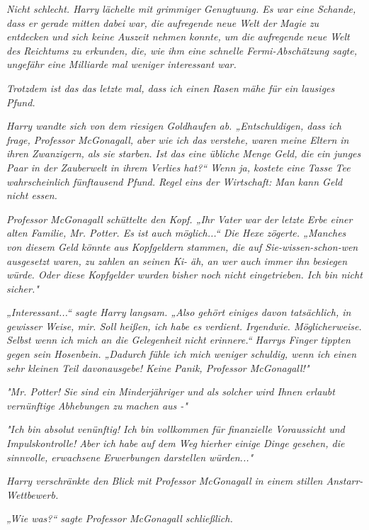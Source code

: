 {\emph{Nicht schlecht. Harry lächelte mit grimmiger Genugtuung. Es war eine Schande, dass er gerade mitten dabei war, die aufregende neue Welt der} \emph{Magie zu entdecken und sich keine Auszeit nehmen konnte, um die aufregende neue Welt des Reichtums zu erkunden, die, wie ihm eine schnelle Fermi-Abschätzung sagte, ungefähr eine Milliarde mal weniger interessant war.}

\emph{\emph{Trotzdem ist das das letzte mal, dass ich einen Rasen mähe für ein lausiges Pfund.}}

\emph{Harry wandte sich von dem riesigen Goldhaufen ab. „Entschuldigen, dass ich frage, Professor McGonagall, aber wie ich das verstehe, waren meine Eltern in ihren Zwanzigern, als sie starben. Ist das eine übliche Menge Geld, die ein junges Paar in der Zauberwelt in ihrem Verlies hat?“ Wenn ja, kostete eine Tasse Tee wahrscheinlich fünftausend Pfund. Regel eins der Wirtschaft: Man kann Geld nicht essen.}

\emph{Professor McGonagall schüttelte den Kopf. „Ihr Vater war der letzte Erbe einer alten Familie, Mr. Potter. Es ist auch möglich...“ Die Hexe zögerte. „Manches von diesem Geld könnte aus Kopfgeldern stammen, die auf Sie-wissen-schon-wen ausgesetzt waren, zu zahlen an seinen Ki- äh, an wer auch immer ihn besiegen würde. Oder diese Kopfgelder wurden bisher noch nicht eingetrieben. Ich bin nicht sicher."}

\emph{„Interessant...“ sagte Harry langsam. „Also gehört einiges davon tatsächlich, in gewisser Weise, mir. Soll heißen, ich habe es verdient. Irgendwie. Möglicherweise. Selbst wenn ich mich an die Gelegenheit nicht erinnere.“ Harrys Finger tippten gegen sein Hosenbein. „Dadurch fühle ich mich weniger schuldig, wenn ich} \emph{\emph{einen sehr kleinen Teil davon}\emph{ausgebe! Keine Panik, Professor McGonagall!}"}

\emph{"Mr. Potter! Sie sind ein Minderjähriger und als solcher wird Ihnen erlaubt} \emph{\emph{vernünftige}} \emph{Abhebungen zu machen aus -"}

\emph{"Ich bin} \emph{\emph{absolut}} \emph{venünftig! Ich bin vollkommen für finanzielle Voraussicht und Impulskontrolle! Aber ich} \emph{\emph{habe}} \emph{auf dem Weg hierher einige Dinge gesehen, die} \emph{\emph{sinnvolle, erwachsene}} \emph{Erwerbungen darstellen würden..."}

\emph{Harry verschränkte den Blick mit Professor McGonagall in einem stillen Anstarr-Wettbewerb.}

\emph{„Wie was?“ sagte Professor McGonagall schließlich.}

}
